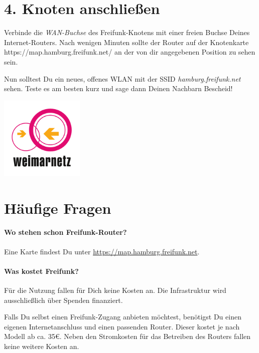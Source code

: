 \documentclass[10pt,a4paper,notumble]{leaflet}
\begin{document}
\section{4. Knoten anschließen}
Verbinde die \textit{WAN-Buchse} des Freifunk-Knotens mit einer freien Buchse Deines Internet-Routers. Nach wenigen Minuten sollte der Router auf der Knotenkarte \mbox{https://map.hamburg.freifunk.net/} an der von dir angegebenen Position zu sehen sein.

Nun solltest Du ein neues, offenes WLAN mit der SSID \mbox{\textit{hamburg.freifunk.net}} sehen. Teste es am besten kurz und sage dann Deinen Nachbarn Bescheid!

\vspace{1em}

\begin{center}
\includegraphics[width=40mm]{weimarnetz_logo.png}
\end{center}




\newpage
\section{Häufige Fragen}
\setlength{\parskip}{0.1em}
\paragraph{Wo stehen schon Freifunk-Router?} Eine Karte findest Du unter \href{https://map.hamburg.freifunk.net}{https://map.hamburg.freifunk.net}.

\paragraph{Was kostet Freifunk?}
Für die Nutzung fallen für Dich keine Kosten an. Die Infrastruktur wird ausschließlich über Spenden finanziert.

Falls Du selbst einen Freifunk-Zugang anbieten möchtest, benötigst Du einen eigenen Internetanschluss und einen passenden Router. Dieser kostet je nach Modell ab ca. 35€.  Neben den Stromkosten für das Betreiben des Routers fallen keine weitere Kosten an.
\end{document}
